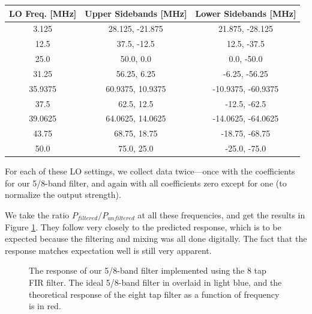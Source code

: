 \documentclass[12pt]{article}
\begin{document}
\begin{center}
  \begin{tabular}{c | c | c }
    LO Freq. [MHz] & Upper Sidebands [MHz] & Lower Sidebands [MHz] \\ \hline
    3.125 & 28.125, -21.875 & 21.875, -28.125 \\
    12.5 & 37.5, -12.5 & 12.5, -37.5 \\
    25.0 & 50.0, 0.0 & 0.0, -50.0 \\
    31.25 & 56.25, 6.25 & -6.25, -56.25 \\
    35.9375 & 60.9375, 10.9375 & -10.9375, -60.9375 \\
    37.5 & 62.5, 12.5 & -12.5, -62.5 \\
    39.0625 & 64.0625, 14.0625 & -14.0625, -64.0625 \\
    43.75 & 68.75, 18.75 & -18.75, -68.75 \\
    50.0 & 75.0, 25.0 & -25.0, -75.0 \\
    \end{tabular}
\end{center}

For each of these LO settings, we collect data twice---once with the coefficients for our 5/8-band filter, and again with all coefficients zero except for one (to normalize the output strength).

We take the ratio $P_{filtered} / P_{unfiltered}$ at all these frequencies, and get the results in Figure \ref{fig:firresponse}. They follow very closely to the predicted response, which is to be expected because the filtering and mixing was all done digitally. The fact that the response matches expectation well is still very apparent.
\begin{figure}[H]
\caption[SODUMB]{The response of our 5/8-band filter implemented using the 8 tap FIR filter. The ideal 5/8-band filter in overlaid in light blue, and the theoretical response of the eight tap filter as a function of frequency is in red.}
\label{fig:firresponse}
\end{figure}
\end{document}
